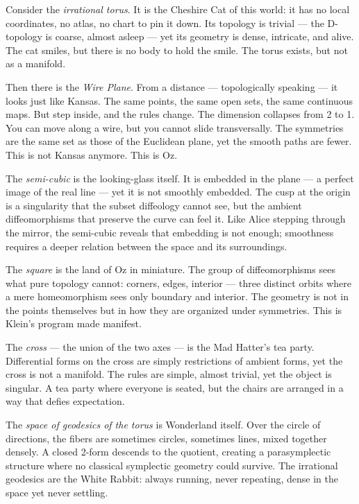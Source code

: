 Consider the \emph{irrational torus}.
It is the Cheshire Cat of this world:
it has no local coordinates,
no atlas,
no chart to pin it down.
Its topology is trivial
— the D-topology is coarse, almost asleep —
yet its geometry is dense,
intricate,
and alive.
The cat smiles,
but there is no body to hold the smile.
The torus exists,
but not as a manifold.

Then there is the \emph{Wire Plane}.
From a distance
— topologically speaking —
it looks just like Kansas.
The same points, the same open sets,
the same continuous maps. But step inside,
and the rules change.
The dimension collapses from 2 to 1.
You can move along a wire,
but you cannot slide transversally.
The symmetries are the same set as those of the Euclidean plane,
yet the smooth paths are fewer.
This is not Kansas anymore.
This is Oz.

The \emph{semi-cubic} is the looking-glass itself.
It is embedded in the plane — a perfect image of the real line
— yet it is not smoothly embedded.
The cusp at the origin is a singularity that the subset diffeology cannot see,
but the ambient diffeomorphisms that preserve the curve can feel it.
Like Alice stepping through the mirror,
the semi-cubic reveals that embedding is not enough;
smoothness requires a deeper relation between the space and its surroundings.

The \emph{square} is the land of Oz in miniature.
The group of diffeomorphisms sees what pure topology cannot:
corners,
edges,
interior
— three distinct orbits where a mere homeomorphism sees only boundary and interior.
The geometry is not in the points themselves but in how they are organized under symmetries.
This is Klein's program made manifest.

The \emph{cross}
— the union of the two axes —
is the Mad Hatter's tea party.
Differential forms on the cross are simply restrictions of ambient forms,
yet the cross is not a manifold.
The rules are simple,
almost trivial,
yet the object is singular.
A tea party where everyone is seated,
but the chairs are arranged in a way that defies expectation.

The \emph{space of geodesics of the torus} is Wonderland itself.
Over the circle of directions, the fibers are sometimes circles,
sometimes lines,
mixed together densely.
A closed 2-form descends to the quotient,
creating a parasymplectic structure where no classical symplectic geometry could survive.
The irrational geodesics are the White Rabbit:
always running,
never repeating,
dense in the space yet never settling.

